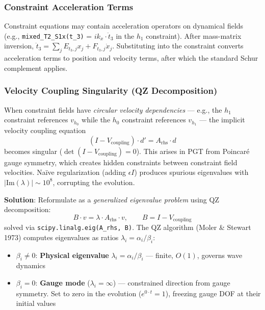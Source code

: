 \subsubsection{Constraint Acceleration Terms}
\label{sec:modal-constraint-accel}

Constraint equations may contain acceleration operators on dynamical fields (e.g., \texttt{mixed\_T2\_S1x(t\_3)} = $ik_x \cdot \ddot{t}_3$ in the $h_1$ constraint). After mass-matrix inversion, $\ddot{t}_3 = \sum_j E_{t_3,j} x_j + F_{t_3,j} \dot{x}_j$. Substituting into the constraint converts acceleration terms to position and velocity terms, after which the standard Schur complement applies.

\subsubsection{Velocity Coupling Singularity (QZ Decomposition)}
\label{sec:modal-qz-velocity}

When constraint fields have \emph{circular velocity dependencies} --- e.g., the $h_1$ constraint references $v_{h_0}$ while the $h_0$ constraint references $v_{h_1}$ --- the implicit velocity coupling equation
\begin{equation}
  (I - V_\text{coupling}) \cdot d' = A_\text{rhs} \cdot d
  \label{eq:vel-coupling-implicit}
\end{equation}
becomes singular ($\det(I - V_\text{coupling}) = 0$). This arises in PGT from Poincar\'e gauge symmetry, which creates hidden constraints between constraint field velocities. Na\"ive regularization (adding $\epsilon I$) produces spurious eigenvalues with $|\mathrm{Im}(\lambda)| \sim 10^8$, corrupting the evolution.

\textbf{Solution}: Reformulate as a \emph{generalized eigenvalue problem} using QZ decomposition:
\begin{equation}
  B \cdot v = \lambda \cdot A_\text{rhs} \cdot v, \qquad B = I - V_\text{coupling}
  \label{eq:qz-generalized}
\end{equation}
solved via \texttt{scipy.linalg.eig(A\_rhs, B)}. The QZ algorithm (Moler \& Stewart 1973) computes eigenvalues as ratios $\lambda_i = \alpha_i / \beta_i$:
\begin{itemize}
  \item $\beta_i \neq 0$: \textbf{Physical eigenvalue} $\lambda_i = \alpha_i/\beta_i$ --- finite, $O(1)$, governs wave dynamics
  \item $\beta_i = 0$: \textbf{Gauge mode} ($\lambda_i = \infty$) --- constrained direction from gauge symmetry. Set to zero in the evolution ($e^{0 \cdot t} = 1$), freezing gauge DOF at their initial values
\end{itemize}

